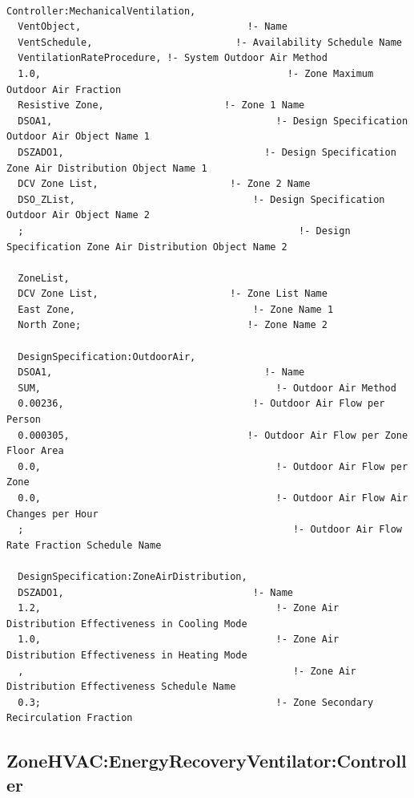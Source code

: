 \begin{lstlisting}

Controller:MechanicalVentilation,
  VentObject,                             !- Name
  VentSchedule,                         !- Availability Schedule Name
  VentilationRateProcedure, !- System Outdoor Air Method
  1.0,                                           !- Zone Maximum Outdoor Air Fraction
  Resistive Zone,                     !- Zone 1 Name
  DSOA1,                                       !- Design Specification Outdoor Air Object Name 1
  DSZADO1,                                   !- Design Specification Zone Air Distribution Object Name 1
  DCV Zone List,                       !- Zone 2 Name
  DSO_ZList,                               !- Design Specification Outdoor Air Object Name 2
  ;                                                !- Design Specification Zone Air Distribution Object Name 2

  ZoneList,
  DCV Zone List,                       !- Zone List Name
  East Zone,                               !- Zone Name 1
  North Zone;                             !- Zone Name 2

  DesignSpecification:OutdoorAir,
  DSOA1,                                     !- Name
  SUM,                                         !- Outdoor Air Method
  0.00236,                                 !- Outdoor Air Flow per Person
  0.000305,                               !- Outdoor Air Flow per Zone Floor Area
  0.0,                                         !- Outdoor Air Flow per Zone
  0.0,                                         !- Outdoor Air Flow Air Changes per Hour
  ;                                               !- Outdoor Air Flow Rate Fraction Schedule Name

  DesignSpecification:ZoneAirDistribution,
  DSZADO1,                                 !- Name
  1.2,                                         !- Zone Air Distribution Effectiveness in Cooling Mode
  1.0,                                         !- Zone Air Distribution Effectiveness in Heating Mode
  ,                                               !- Zone Air Distribution Effectiveness Schedule Name
  0.3;                                         !- Zone Secondary Recirculation Fraction
\end{lstlisting}

\subsection{ZoneHVAC:EnergyRecoveryVentilator:Controller}\label{zonehvacenergyrecoveryventilatorcontroller}

